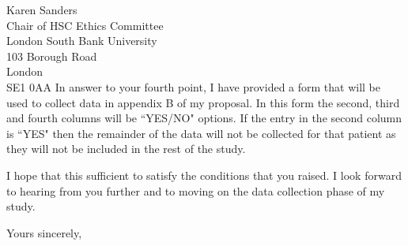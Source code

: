\documentclass
[
	12pt,
	a4paper,
	oneside
]{letter}
\begin{document}
\begin{letter}{Karen Sanders\\
		Chair of HSC Ethics Committee\\
		London South Bank University\\
		103 Borough Road\\
		London\\
		SE1 0AA}
In answer to your fourth point, I have provided a form that will be used to 
collect data in appendix B of my proposal. In this form the second, third and 
fourth columns will be ``YES/NO" options. If the entry in the second column is 
``YES" then the remainder of the data will not be collected for that patient as 
they will not be included in the rest of the study.

I hope that this sufficient to satisfy the conditions that you raised. I look
forward to hearing from you further and to moving on the data collection phase 
of my study.

\closing{Yours sincerely,}


\end{letter}
\end{document}

